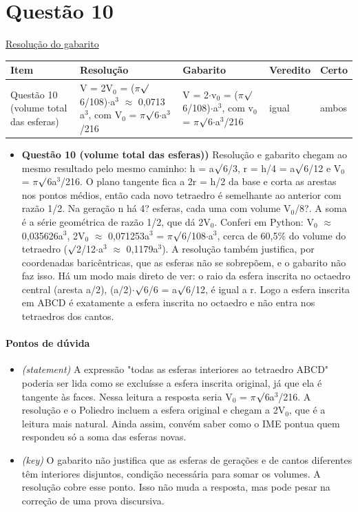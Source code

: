 \documentclass{article}%
\begin{document}
\section*{Questão 10}%
\href{https://poliedroresolve.sistemapoliedro.com.br/vestibulares/ime/2026/ime-2-fase-dia-1-23-10-2025-2-fase-dia-1/dissertativa-10-matematica-2-fase-dia-1-ime-2026}{Resolução do gabarito}\par\smallskip%
\begin{longtable}{@{}p{} p{} p{} p{} p{}@{}}\toprule Item & Resolução & Gabarito & Veredito & Certo \\ \midrule
Questão 10 (volume total das esferas) & V = 2V$_{0}$ = ($\pi$$\surd$6/108)$\cdot$a$^3$ $\approx$ 0,0713 a$^3$, com V$_{0}$ = $\pi$$\surd$6$\cdot$a$^3$/216 & V = 2$\cdot$v$_{0}$ = ($\pi$$\surd$6/108)$\cdot$a$^3$, com v$_{0}$ = $\pi$$\surd$6$\cdot$a$^3$/216 & igual & ambos \\
\bottomrule\end{longtable}%
\begin{itemize}%
\item%
\textbf{Questão 10 (volume total das esferas))} Resolução e gabarito chegam ao mesmo resultado pelo mesmo caminho: h = a$\surd$6/3, r = h/4 = a$\surd$6/12 e V$_{0}$ = $\pi$$\surd$6a$^3$/216. O plano tangente fica a 2r = h/2 da base e corta as arestas nos pontos médios, então cada novo tetraedro é semelhante ao anterior com razão 1/2. Na geração n há 4? esferas, cada uma com volume V$_{0}$/8?. A soma é a série geométrica de razão 1/2, que dá 2V$_{0}$. Conferi em Python: V$_{0}$ $\approx$ 0,035626a$^3$, 2V$_{0}$ $\approx$ 0,071253a$^3$ = $\pi$$\surd$6/108$\cdot$a$^3$, cerca de 60,5\% do volume do tetraedro ($\surd$2/12$\cdot$a$^3$ $\approx$ 0,1179a$^3$). A resolução também justifica, por coordenadas baricêntricas, que as esferas não se sobrepõem, e o gabarito não faz isso. Há um modo mais direto de ver: o raio da esfera inscrita no octaedro central (aresta a/2), (a/2)$\cdot$$\surd$6/6 = a$\surd$6/12, é igual a r. Logo a esfera inscrita em ABCD é exatamente a esfera inscrita no octaedro e não entra nos tetraedros dos cantos.%
\end{itemize}%
\paragraph{Pontos de dúvida}%
\begin{itemize}%
\item%
\textit{(statement)} A expressão "todas as esferas interiores ao tetraedro ABCD" poderia ser lida como se excluísse a esfera inscrita original, já que ela é tangente às faces. Nessa leitura a resposta seria V$_{0}$ = $\pi$$\surd$6a$^3$/216. A resolução e o Poliedro incluem a esfera original e chegam a 2V$_{0}$, que é a leitura mais natural. Ainda assim, convém saber como o IME pontua quem respondeu só a soma das esferas novas.%
\item%
\textit{(key)} O gabarito não justifica que as esferas de gerações e de cantos diferentes têm interiores disjuntos, condição necessária para somar os volumes. A resolução cobre esse ponto. Isso não muda a resposta, mas pode pesar na correção de uma prova discursiva.%
\end{itemize}%
\end{document}
